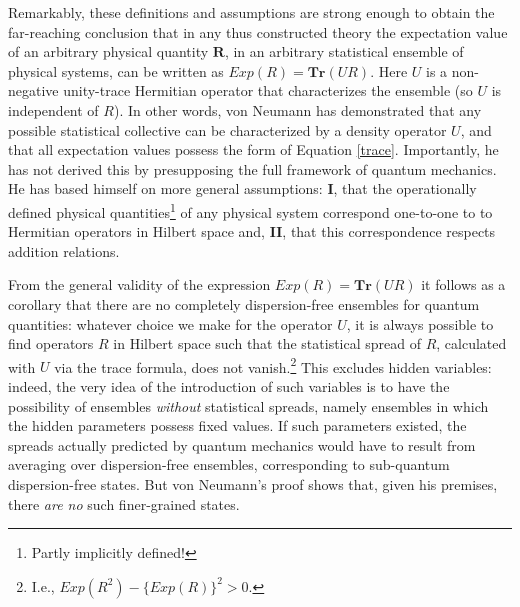 \documentclass[12pt]{article}
\begin{document}
Remarkably, these definitions and assumptions are strong enough to obtain \cite[pp.\@ 167--168]{VN1} the far-reaching conclusion that in any thus constructed theory the expectation value of an arbitrary physical quantity $\textbf{R}$, in an arbitrary statistical ensemble of physical systems, can be written as $Exp(R) = \textbf{Tr}(UR)$. Here $U$ is a non-negative unity-trace Hermitian operator that characterizes the ensemble (so $U$ is independent of $R$). In other words, von Neumann has demonstrated that any possible statistical collective can be characterized by a density operator $U$, and that all expectation values possess the form of Equation \ref{trace}. Importantly, he has not derived this by presupposing the full framework of quantum mechanics. He has based himself on more general assumptions: \textbf{I}, that the operationally defined physical quantities\footnote{Partly implicitly defined!} of any physical system correspond one-to-one to to Hermitian operators in Hilbert space and, \textbf{II}, that this correspondence respects addition relations.

From the general validity of the expression $Exp(R) = \textbf{Tr}(UR)$ it follows as a corollary that there are no completely dispersion-free ensembles for quantum quantities: whatever choice we make for the operator $U$, it is always possible to find operators $R$ in Hilbert space such that the statistical spread of $R$, calculated with $U$ via the trace formula, does not vanish.\footnote{I.e., $Exp(R^2) - \{Exp(R)\}^2 > 0$.} This excludes hidden variables: indeed, the very idea of the introduction of such variables is to have the possibility of ensembles \emph{without} statistical spreads, namely ensembles in which the hidden parameters possess fixed values. If such parameters existed, the spreads actually predicted by quantum mechanics would have to result from averaging over dispersion-free ensembles, corresponding to sub-quantum dispersion-free states. But von Neumann's proof shows that, given his premises, there \emph{are no} such finer-grained states.
\end{document}
